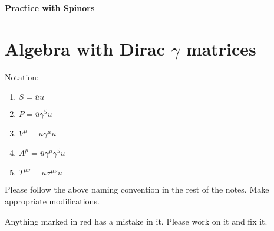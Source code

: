 \documentclass[12pt]{article}
\def \ou{\overline{u}}
\def \ga{\gamma}
\def \si{\sigma}
\def \cre{\color{red}}
\begin{document}
\begin{center}
\underline{\textbf{\Large Practice with Spinors}}
\end{center}

\section{Algebra with Dirac $\ga$ matrices}

Notation:
\begin{enumerate} \itemsep=-15pt
\item $S= \ou u$\\
\item $P=\ou \ga^5 u$ \\
\item $V^\mu = \ou \ga^\mu u$ \\
\item $A^\mu = \ou \ga^\mu \ga^5 u $ \\
\item $T^{\mu\nu} = \ou \si^{\mu\nu} u$
\end{enumerate}
\bigskip

{\cre Please follow the above naming convention in the rest of the notes. Make appropriate modifications.}

{\cre Anything marked in red has a mistake in it. Please work on it and fix it.}
\end{document}
